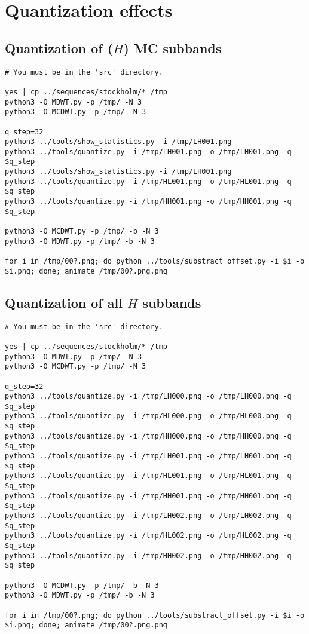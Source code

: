 
\section{Quantization effects}
\subsection{Quantization of ($H$) MC subbands}
\begin{verbatim}
# You must be in the 'src' directory.

yes | cp ../sequences/stockholm/* /tmp
python3 -O MDWT.py -p /tmp/ -N 3
python3 -O MCDWT.py -p /tmp/ -N 3

q_step=32
python3 ../tools/show_statistics.py -i /tmp/LH001.png
python3 ../tools/quantize.py -i /tmp/LH001.png -o /tmp/LH001.png -q $q_step
python3 ../tools/show_statistics.py -i /tmp/LH001.png
python3 ../tools/quantize.py -i /tmp/HL001.png -o /tmp/HL001.png -q $q_step
python3 ../tools/quantize.py -i /tmp/HH001.png -o /tmp/HH001.png -q $q_step

python3 -O MCDWT.py -p /tmp/ -b -N 3
python3 -O MDWT.py -p /tmp/ -b -N 3

for i in /tmp/00?.png; do python ../tools/substract_offset.py -i $i -o $i.png; done; animate /tmp/00?.png.png
\end{verbatim}

\subsection{Quantization of all $H$ subbands}
\begin{verbatim}
# You must be in the 'src' directory.

yes | cp ../sequences/stockholm/* /tmp
python3 -O MDWT.py -p /tmp/ -N 3
python3 -O MCDWT.py -p /tmp/ -N 3

q_step=32
python3 ../tools/quantize.py -i /tmp/LH000.png -o /tmp/LH000.png -q $q_step
python3 ../tools/quantize.py -i /tmp/HL000.png -o /tmp/HL000.png -q $q_step
python3 ../tools/quantize.py -i /tmp/HH000.png -o /tmp/HH000.png -q $q_step
python3 ../tools/quantize.py -i /tmp/LH001.png -o /tmp/LH001.png -q $q_step
python3 ../tools/quantize.py -i /tmp/HL001.png -o /tmp/HL001.png -q $q_step
python3 ../tools/quantize.py -i /tmp/HH001.png -o /tmp/HH001.png -q $q_step
python3 ../tools/quantize.py -i /tmp/LH002.png -o /tmp/LH002.png -q $q_step
python3 ../tools/quantize.py -i /tmp/HL002.png -o /tmp/HL002.png -q $q_step
python3 ../tools/quantize.py -i /tmp/HH002.png -o /tmp/HH002.png -q $q_step

python3 -O MCDWT.py -p /tmp/ -b -N 3
python3 -O MDWT.py -p /tmp/ -b -N 3

for i in /tmp/00?.png; do python ../tools/substract_offset.py -i $i -o $i.png; done; animate /tmp/00?.png.png
\end{verbatim}

